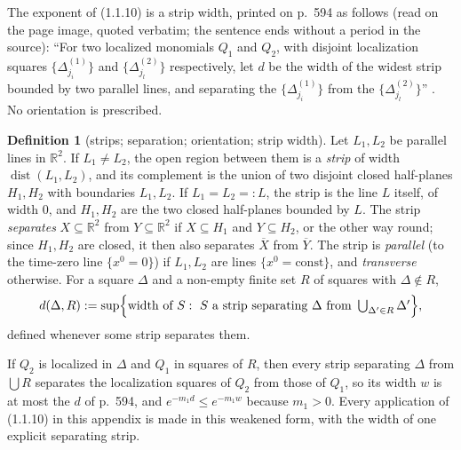 \documentclass[11pt,a4paper]{article}
\theoremstyle{plain}
\theoremstyle{definition}
\theoremstyle{plain}
\theoremstyle{definition}
\newtheorem{auxdef}[auxlemma]{Definition}
\newcommand{\R}{\mathbb{R}}
\DeclareMathOperator{\dist}{dist}
\begin{document}
The exponent of (1.1.10) is a strip width, printed on p.~594 as follows (read on the page
image, quoted verbatim; the sentence ends without a period in the source): ``For two
localized monomials $Q_1$ and $Q_2$, with disjoint localization squares
$\{\Delta^{(1)}_{j_i}\}$ and $\{\Delta^{(2)}_{j_l}\}$ respectively, let $d$ be the width of
the widest strip bounded by two parallel lines, and separating the $\{\Delta^{(1)}_{j_i}\}$
from the $\{\Delta^{(2)}_{j_l}\}$'' \cite[p.~594]{GJS}.  No orientation is prescribed.

\begin{auxdef}[strips; separation; orientation; strip width]\label{aux:notation-stripdef}
Let $L_1,L_2$ be parallel lines in $\R^2$.  If $L_1\ne L_2$, the open region between them is
a \emph{strip} of width $\dist(L_1,L_2)$, and its complement is the union of two disjoint
closed half-planes $H_1,H_2$ with boundaries $L_1,L_2$.  If $L_1=L_2=:L$, the strip is the
line $L$ itself, of width $0$, and $H_1,H_2$ are the two closed half-planes bounded by $L$.
The strip \emph{separates} $X\subseteq\R^2$ from $Y\subseteq\R^2$ if $X\subseteq H_1$ and
$Y\subseteq H_2$, or the other way round; since $H_1,H_2$ are closed, it then also separates
$\overline X$ from $\overline Y$.  The strip is \emph{parallel} (to the time-zero line
$\{x^0=0\}$) if $L_1,L_2$ are lines $\{x^0=\text{const}\}$, and \emph{transverse}
otherwise.  For a square $\Delta$ and a non-empty finite set $R$ of squares with
$\Delta\notin R$,
\[
 d(\Delta,R):=\sup\Bigl\{\text{width of }S:\ S\text{ a strip separating }\Delta\text{ from }
 \textstyle\bigcup_{\Delta'\in R}\Delta'\Bigr\},
\]
defined whenever some strip separates them.
\end{auxdef}

If $Q_2$ is localized in $\Delta$ and $Q_1$ in squares of $R$, then every strip separating
$\Delta$ from $\bigcup R$ separates the localization squares of $Q_2$ from those of $Q_1$, so
its width $w$ is at most the $d$ of p.~594, and $e^{-m_1d}\le e^{-m_1w}$ because $m_1>0$.
Every application of (1.1.10) in this appendix is made in this weakened form, with the width of
one explicit separating strip.
\end{document}
